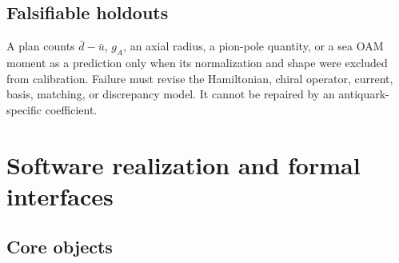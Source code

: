 \documentclass[11pt]{article}
\begin{document}
\subsection{Falsifiable holdouts}

A plan counts \(\bar d-\bar u\), \(g_A\), an axial radius, a pion-pole
quantity, or a sea OAM moment as a prediction only when its normalization and
shape were excluded from calibration.  Failure must revise the Hamiltonian,
chiral operator, current, basis, matching, or discrepancy model.  It cannot be
repaired by an antiquark-specific coefficient.

\section{Software realization and formal interfaces}
\label{sec:software}

\subsection{Core objects}
\end{document}
